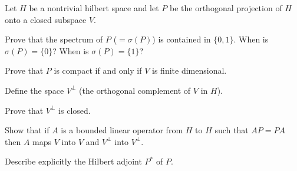 Let $H$ be a nontrivial hilbert space and let $P$ be the orthogonal
projection of $H$ onto a closed subspace $V$. 
\begin{alist}
\item Prove that the spectrum of $P$ ($=\sigma(P)$) is contained in $\{0,
1\}$. When is $\sigma(P)=\{0\}$? When is $\sigma(P)=\{1\}$?
\item Prove that $P$ is compact if and only if $V$ is finite
dimensional.
\item Define the space $V^{\perp}$ (the orthogonal complement of $V$
in $H$).
\item Prove that $V^{\perp}$ is closed.
\item Show that if $A$ is a bounded linear operator from $H$ to $H$
such that $AP=PA$ then $A$ maps $V$ into $V$ and $V^{\perp}$ into
$V^{\perp}$.
\item Describe explicitly the Hilbert adjoint $P^*$ of $P$. 
\end{alist}
